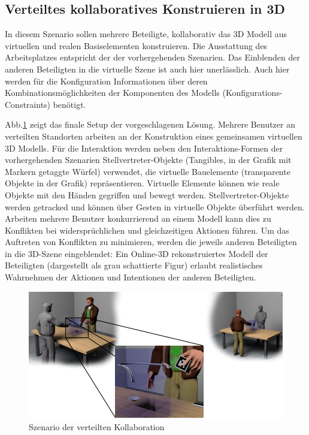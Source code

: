 \subsection{Verteiltes kollaboratives Konstruieren in 3D}
In diesem Szenario sollen mehrere Beteiligte, kollaborativ das 3D Modell aus virtuellen und realen Basiselementen konstruieren. Die Ausstattung des Arbeitsplatzes entspricht der der vorhergehenden Szenarien. Das Einblenden der anderen Beteiligten in die virtuelle Szene ist auch hier unerlässlich. Auch hier werden für die Konfiguration  Informationen über deren Kombinationsmöglichkeiten der Komponenten des Modells (Konfigurations-Constraints) benötigt. 

Abb.\ref{fig:system_overview2} zeigt das finale Setup der vorgeschlagenen Lösung. Mehrere Benutzer an verteilten Standorten arbeiten an der Konstruktion eines gemeinsamen virtuellen 3D Modells. Für die Interaktion werden neben den Interaktions-Formen der vorhergehenden Szenarien Stellvertreter-Objekte (Tangibles, in der Grafik mit Markern getaggte Würfel) verwendet, die virtuelle Bauelemente (transparente Objekte in der Grafik) repräsentieren. Virtuelle Elemente können wie reale Objekte  mit den Händen gegriffen und bewegt werden. Stellvertreter-Objekte werden getracked und können über Gesten in virtuelle Objekte überführt werden. Arbeiten mehrere Benutzer konkurrierend an einem Modell kann dies zu Konflikten bei widersprüchlichen und gleichzeitigen Aktionen führen. Um das Auftreten von Konflikten zu minimieren, werden die jeweils anderen Beteiligten in die 3D-Szene eingeblendet: Ein Online-3D rekonstruiertes Modell der Beteiligten (dargestellt als grau schattierte Figur) erlaubt realistisches Wahrnehmen der Aktionen und Intentionen der anderen Beteiligten.  
\begin{figure}[H]
	\centering
		\includegraphics[width=1.00\textwidth]{figs/system_overview.png}
	\caption{Szenario der verteilten Kollaboration}
	\label{fig:system_overview2}
\end{figure}

